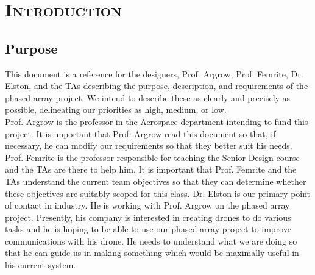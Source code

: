 \documentclass[ProjectRequirements.tex]{subfiles}
\begin{document}
\bigskip

\section{\textsc{\Large Introduction}}
	
	\subsection{Purpose}
	
	This document is a reference for the designers, Prof. Argrow, Prof. Femrite, Dr. Elston, and the TAs describing the purpose, description, and requirements of the phased array project. We intend to describe these as clearly and precisely as possible, delineating our priorities as high, medium, or low. \\

Prof. Argrow is the professor in the Aerospace department intending to fund this project. It is important that Prof. Argrow read this document so that, if necessary, he can modify our requirements so that they better suit his needs. Prof. Femrite is the professor responsible for teaching the Senior Design course and the TAs are there to help him. It is important that Prof. Femrite and the TAs understand the current team objectives so that they can determine whether these objectives are suitably scoped for this class. Dr. Elston is our primary point of contact in industry. He is working with Prof. Argrow on the phased array project. Presently, his company is interested in creating drones to do various tasks and he is hoping to be able to use our phased array project to improve communications with his drone. He needs to understand what we are doing so that he can guide us in making something which would be maximally useful in his current system.
\end{document}
